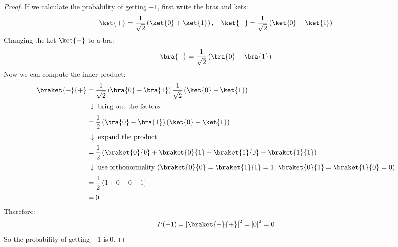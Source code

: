 \begin{examplebox}
\begin{proof}
      If we calculate the probability of getting $-1$, first write the bras and kets:
      \begin{equation*}
         \ket{+} = \dfrac{1}{\sqrt{2}}\left(\ket{0} + \ket{1}\right), \quad \ket{-} = \dfrac{1}{\sqrt{2}}\left(\ket{0} - \ket{1}\right)
      \end{equation*}
      Changing the ket $\ket{+}$ to a bra:
      \begin{equation*}
         \bra{-} = \dfrac{1}{\sqrt{2}}\left(\bra{0} - \bra{1}\right)
      \end{equation*}
      Now we can compute the inner product:
      \begin{align*}
         \braket{-}{+} =& \: \dfrac{1}{\sqrt{2}} \left(\bra{0} - \bra{1}\right) \dfrac{1}{\sqrt{2}} \left(\ket{0} + \ket{1}\right) \\[.2em]
         \downarrow     & \: \text{ bring out the factors} \\[.2em]
         =              & \: \dfrac{1}{2} \left(\bra{0} - \bra{1}\right) \left(\ket{0} + \ket{1}\right) \\[.2em]
         \downarrow     & \: \text{ expand the product} \\[.2em]
         =              & \: \dfrac{1}{2} \left(\braket{0}{0} + \braket{0}{1} - \braket{1}{0} - \braket{1}{1}\right) \\[.2em]
         \downarrow     & \: \text{ use orthonormality ($\braket{0}{0} = \braket{1}{1} = 1$, $\braket{0}{1} = \braket{1}{0} = 0$)} \\[.2em]
         =              & \: \dfrac{1}{2} \left(1 + 0 - 0 - 1\right) \\[.2em]
         =              & \: 0
      \end{align*}
      Therefore:
      \begin{equation*}
         P(-1) = \left|\braket{-}{+}\right|^{2} = \left|0\right|^{2} = 0
      \end{equation*}
      So the probability of getting $-1$ is $0$.
   \end{proof}
\end{examplebox}